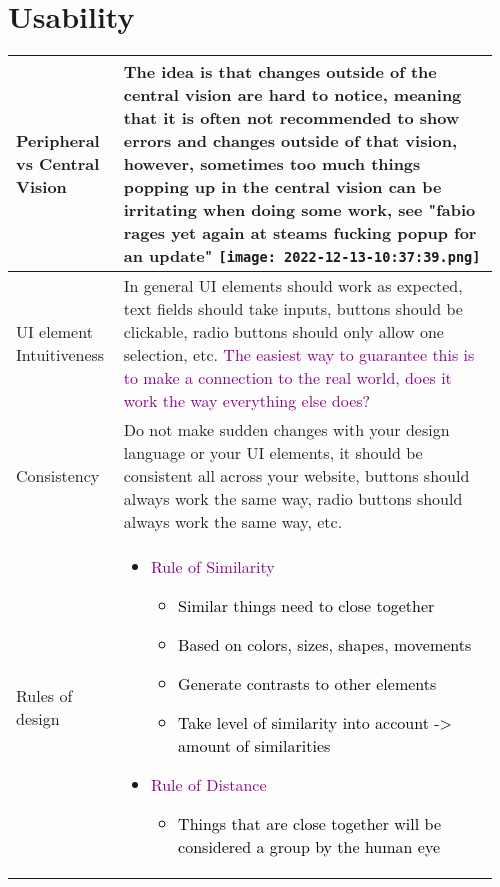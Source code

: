 \documentclass[main.tex,fontsize=8pt,paper=a4,paper=portrait,DIV=calc,]{scrartcl}
\begin{document}
\begin{table}[ht!]
\section{Usability}
\begin{tabular}{|m{0.2\linewidth}|m{0.755\linewidth}|}
\hline
Peripheral vs Central Vision & 
The idea is that changes outside of the central vision are hard to notice, meaning that it is often not recommended to show errors and changes outside of that vision, however, sometimes too much things popping up in the central vision can be irritating when doing some work, see "fabio rages yet again at steams fucking popup for an update"\newline
\texttt{[image: 2022-12-13-10:37:39.png]}\\
\hline
UI element Intuitiveness & 
In general UI elements should work as expected, text fields should take inputs, buttons should be clickable, radio buttons should only allow one selection, etc.\newline
\textcolor{purple}{The easiest way to guarantee this is to make a connection to the real world, does it work the way everything else does?}\\
\hline
Consistency & 
Do not make sudden changes with your design language or your UI elements, it should be consistent all across your website, buttons should always work the same way, radio buttons should always work the same way, etc.\\
\hline
Rules of design & 
\vspace{2mm}
\begin{itemize}
\item \textcolor{purple}{Rule of Similarity}\newline
  \begin{itemize}
  \item \textcolor{black}{Similar things need to close together}
  \item \textcolor{black}{Based on colors, sizes, shapes, movements}
  \item \textcolor{black}{Generate contrasts to other elements}
  \item \textcolor{black}{Take level of similarity into account -> amount of similarities}
  \end{itemize} 
\item \textcolor{purple}{Rule of Distance}\newline
  \begin{itemize}
  \item \textcolor{black}{Things that are close together will be considered a group by the human eye}

\end{itemize}
\end{itemize}
\end{tabular}
\end{table}
\end{document}
